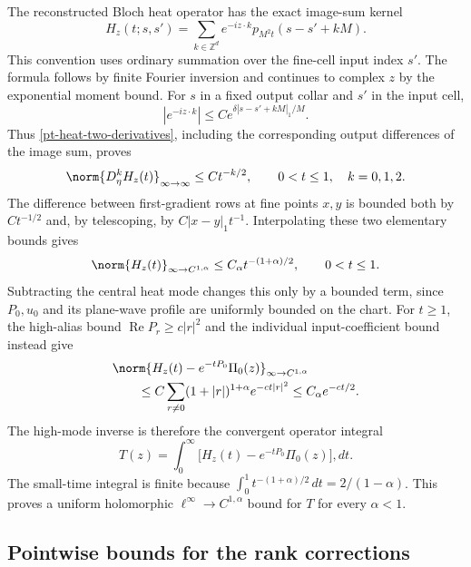 The reconstructed Bloch heat operator has the exact image-sum kernel
\begin{equation}\label{pt-twisted-heat}
 H_z(t;s,s')=\sum_{k\in\mathbb Z^d}
             e^{-iz\cdot k}p_{M^2t}(s-s'+kM).
\end{equation}
This convention uses ordinary summation over the fine-cell input
index $s'$. The formula follows by finite Fourier inversion and
continues to complex $z$ by the exponential moment bound.
For $s$ in a fixed output collar and $s'$ in the input cell,
\[
 |e^{-iz\cdot k}|
       \le C e^{\delta|s-s'+kM|_1/M}.
\]
Thus \eqref{pt-heat-two-derivatives}, including the corresponding
output differences of the image sum, proves
\begin{equation}\label{pt-twisted-derivatives}
 \norm{D_\eta^kH_z(t)}_{\infty\to\infty}
       \le Ct^{-k/2},\qquad 0<t\le1,\quad k=0,1,2.
\end{equation}
The difference between first-gradient rows at fine points $x,y$ is
bounded both by $Ct^{-1/2}$ and, by telescoping, by
$C|x-y|_1t^{-1}$. Interpolating these two elementary bounds gives
\begin{equation}\label{pt-heat-holder}
 \norm{H_z(t)}_{\infty\to C^{1,\alpha}}
       \le C_\alpha t^{-(1+\alpha)/2},\qquad 0<t\le1.
\end{equation}
Subtracting the central heat mode changes this only by a bounded
term, since $P_0,u_0$ and its plane-wave profile are uniformly bounded
on the chart. For $t\ge1$, the high-alias bound
$\operatorname{Re}P_r\ge c|r|^2$ and the individual input-coefficient
bound instead give
\begin{align}
 &\norm{H_z(t)-e^{-tP_0}\Pi_0(z)}_{\infty\to C^{1,\alpha}}
       \notag\\
 &\qquad\le C\sum_{r\ne0}(1+|r|)^{1+\alpha}e^{-ct|r|^2}
       \le C_\alpha e^{-ct/2}.
       \label{pt-heat-large-time}
\end{align}
The high-mode inverse is therefore the convergent operator integral
\begin{equation}\label{pt-scalar-integral}
 T(z)=\int_0^\infty
             \bigl[H_z(t)-e^{-tP_0}\Pi_0(z)\bigr],dt.
\end{equation}
The small-time integral is finite because
$\int_0^1t^{-(1+\alpha)/2}\,dt=2/(1-\alpha)$.
This proves a uniform holomorphic
$\ell^\infty\to C^{1,\alpha}$ bound for $T$ for every $\alpha<1$.

\subsection{Pointwise bounds for the rank corrections}

